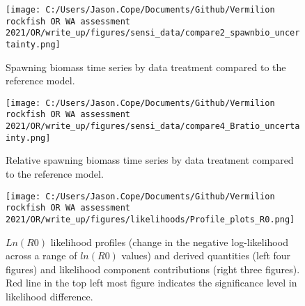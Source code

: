 \documentclass[11pt,
  english,
  a4paper,
]{article}
\begin{document}
\begin{figure}
\centering
\texttt{[image: C:/Users/Jason.Cope/Documents/Github/Vermilion rockfish OR WA assessment 2021/OR/write\_up/figures/sensi\_data/compare2\_spawnbio\_uncertainty.png]}
\caption{Spawning biomass time series by data treatment compared to the reference model.\label{fig:sensi-modspec-ssb}}
\end{figure}

\tagmcend\tagstructend


\begin{figure}
\centering
\texttt{[image: C:/Users/Jason.Cope/Documents/Github/Vermilion rockfish OR WA assessment 2021/OR/write\_up/figures/sensi\_data/compare4\_Bratio\_uncertainty.png]}
\caption{Relative spawning biomass time series by data treatment compared to the reference model.\label{fig:sensi-modspec-depl}}
\end{figure}

\tagmcend\tagstructend


\begin{figure}
\centering
\texttt{[image: C:/Users/Jason.Cope/Documents/Github/Vermilion rockfish OR WA assessment 2021/OR/write\_up/figures/likelihoods/Profile\_plots\_R0.png]}
\caption{{\(Ln(R0)\)\leavevmode\tagmcend\tagstructend} likelihood profiles (change in the negative log-likelihood across a range of {\(ln(R0)\)\leavevmode\tagmcend\tagstructend} values) and derived quantities (left four figures) and likelihood component contributions (right three figures). Red line in the top left most figure indicates the significance level in likelihood difference.\label{fig:r0-profile-combo}}
\end{figure}

\tagmcend\tagstructend
\end{document}
